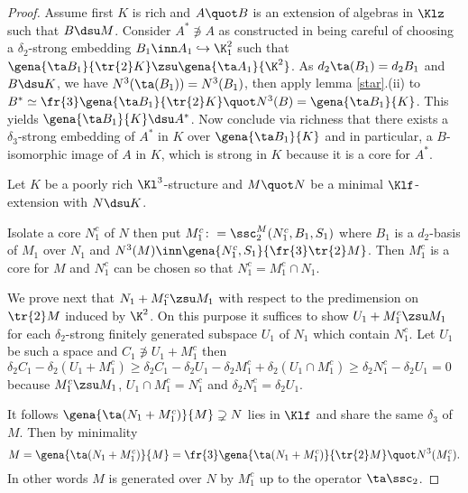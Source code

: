 \begin{proof}
Assume first $K$ is rich and $A\quot B$ is an extension of algebras in $\Klz$ such that $B\dsu M$.
Consider $A^{*}\nni A$ as constructed in  being careful of choosing a $\delta_{2}$-strong embedding $B_{1}\inn A_{1}\hookrightarrow \K^{2}_{1}$ such that $\gena{\ta B_{1}}{\tr{2}K}\zsu\gena{\ta A_{1}}{\K^{2}}$. As $d_{2}\ta(B_{1})=d_{2}B_{1}$ and
$B\dsu K$, we have $N^{3}(\ta(B_{1}))=N^{3}(B_{1})$, then apply lemma \ref{star}.(ii) to
$B^{*}\simeq\fr{3}\gena{\ta B_{1}}{\tr{2}K}\quot N^{3}(B)=\gena{\ta B_{1}}{K}$. This yields $\gena{\ta B_{1}}{K}\dsu A^{*}$. Now conclude via richness that there exists a $\delta_{3}$-strong embedding of $A^{*}$ in $K$ over $\gena{\ta B_{1}}{K}$
and in particular, a $B$-isomorphic image of $A$ in $K$, which is strong in $K$ because it is a core for $A^{*}$.

\medskip  
Let $K$ be a poorly rich $\Kl^{3}$-structure and $M\quot N$ be a minimal $\Klf$-extension with $N\dsu K$.

Isolate a core $N_{1}^{c}$ of $N$ then put $M_{1}^{c}\colon=\ssc_{2}^{M}(N_{1}^{c},B_{1},S_{1})$ where
$B_{1}$ is a $d_{2}$-basis of $M_{1}$ over $N_{1}$ and $N^{3}(M)\inn\gena{N^{c}_{1},S_{1}}{\fr{3}\tr{2}M}$.
Then $M_{1}^{c}$ is a core for $M$ and $N_{1}^{c}$ can be chosen so that $N_{1}^{c}=M_{1}^{c}\cap N_{1}$.

We prove next that $N_{1}+M_{1}^{c}\zsu M_{1}$ with respect to the predimension on  $\tr{2}M$ induced by
$\K^{2}$. On this purpose it suffices to show $U_{1}+M_{1}^{c}\zsu M_{1}$ for each $\delta_{2}$-strong
finitely generated subspace $U_{1}$ of $N_{1}$ which contain $N_{1}^{c}$. Let $U_{1}$ be such a space
and $C_{1}\nni U_{1}+M_{1}^{c}$ then $\delta_{2}C_{1}-\delta_{2}(U_{1}+M_{1}^{c})\geq\delta_{2}C_{1}-
\delta_{2}U_{1}-\delta_{2}M_{1}^{c}+\delta_{2}(U_{1}\cap M_{1}^{c})\geq\delta_{2}N_{1}^{c}-\delta_{2}U_{1}=0$
because $M_{1}^{c}\zsu M_{1}$, $U_{1}\cap M_{1}^{c}=N_{1}^{c}$ and $\delta_{2}N_{1}^{c}=\delta_{2}U_{1}$.

It follows $\gena{\ta(N_{1}+M_{1}^{c})}{M}\supsetneq N$ lies in $\Klf$ and share the same $\delta_{3}$ of
$M$. Then by minimality
$$M=\gena{\ta(N_{1}+M_{1}^{c})}{M}=\fr{3}\gena{\ta(N_{1}+M_{1}^{c})}{\tr{2}M}\quot N^{3}(M_{1}^{c}).$$
In other words
$M$ is generated
over $N$ by $M_{1}^{c}$ up to the operator $\ta\ssc_{2}$.


\end{proof}
